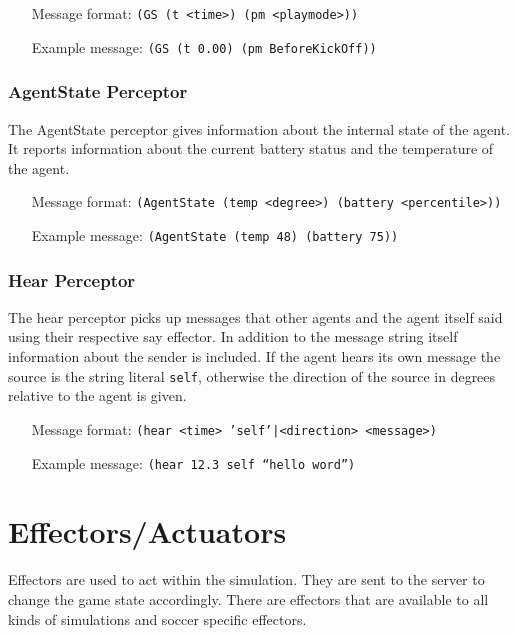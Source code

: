 \begin{itemize}
	\item[Message format:] \texttt{(GS (t <time>) (pm <playmode>))}
	\item[Example message:] \texttt{(GS (t 0.00) (pm BeforeKickOff))}
\end{itemize}

\subsubsection{AgentState Perceptor}

The AgentState perceptor gives information about the internal state of
the agent. It reports information about the current battery status and
the temperature of the agent.

\begin{itemize}
	\item[Message format:] \texttt{(AgentState (temp <degree>) (battery <percentile>))}
	\item[Example message:] \texttt{(AgentState (temp 48) (battery 75))}
\end{itemize}

\subsubsection{Hear Perceptor}

The hear perceptor picks up messages that other agents and the agent
itself said using their respective say effector. In addition to the
message string itself information about the sender is included. If the
agent hears its own message the source is the string literal
\texttt{self}, otherwise the direction of the source in degrees 
relative to the agent is given.

\begin{itemize}
	\item[Message format:] \texttt{(hear <time>
	'self'|<direction> <message>)} \item[Example message:]
	\texttt{(hear 12.3 self ``hello word'')}
\end{itemize}

\section{Effectors/Actuators}
Effectors are used to act within the simulation. They are sent to the server
to change the game state accordingly. There are effectors that are available to
all kinds of simulations and soccer specific effectors.

